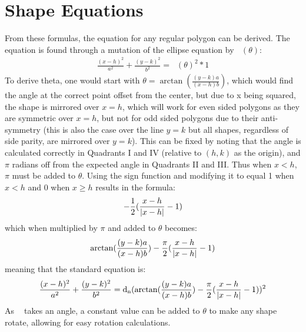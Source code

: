\documentclass[11pt]{article}
\DeclareMathOperator{\custd}{\mathrm{d}_n}
\DeclareMathOperator{\custdsq}{\mathrm{d}_n}
\DeclarePairedDelimiter\abs{\lvert}{\rvert}%
\begin{document}
\section{Shape Equations}
From these formulas, the equation for any regular polygon can be derived. The equation is found through a mutation of the ellipse equation by \(\custd(\theta)\):
\begin{gather*}
\frac{(x-h)^2}{a^2}+\frac{(y-k)^2}{b^2}=\custd(\theta)^2*1
\end{gather*}
To derive theta, one would start with \(\theta=\arctan(\frac{(y-k)a}{(x-h)b})\), which would find the angle at the correct point offset from the center, but due to x being squared, the shape is mirrored over \(x=h\), which will work for even sided polygons as they are symmetric over \(x=h\), but not for odd sided polygons due to their anti-symmetry (this is also the case over the line \(y=k\) but all shapes, regardless of side parity, are mirrored over \(y=k\)). This can be fixed by noting that the angle is calculated correctly in Quadrants I and IV (relative to \((h,k)\) as the origin), and \(\pi\) radians off from the expected angle in Quadrants II and III. Thus when \(x<h\), \(\pi\) must be added to \(\theta\). Using the sign function and modifying it to equal 1 when \(x<h\) and 0 when \(x\geq h\) results in the formula:
\begin{gather*}
-\frac{1}{2}(\frac{x-h}{\abs{x-h}}-1)
\end{gather*}
which when multiplied by \(\pi\) and added to \(\theta\) becomes:
\begin{gather*}
\arctan(\frac{(y-k)a}{(x-h)b})-\frac{\pi}{2}(\frac{x-h}{\abs{x-h}}-1)
\end{gather*}
meaning that the standard equation is:
\begin{gather*}
\frac{(x-h)^2}{a^2}+\frac{(y-k)^2}{b^2}=\custdsq(\arctan(\frac{(y-k)a}{(x-h)b})-\frac{\pi}{2}(\frac{x-h}{\abs{x-h}}-1))^2
\end{gather*}
As \(\custd\) takes an angle, a constant value can be added to \(\theta\) to make any shape rotate, allowing for easy rotation calculations.
\end{document}

